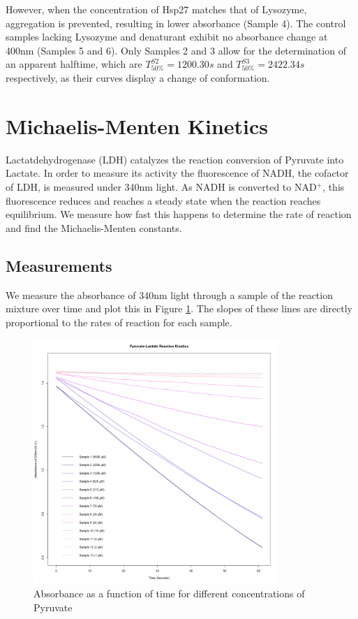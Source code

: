 \documentclass[a4paper,11pt]{article}
\begin{document}
            However, when the concentration of Hsp27 matches that of Lysozyme, aggregation is prevented, 
            resulting in lower absorbance (Sample 4). 
            The control samples lacking Lysozyme and denaturant exhibit no absorbance change at 400nm (Samples 5 and 6). 
            Only Samples 2 and 3 allow for the determination of an apparent halftime, which are $T^{S2}_{50\%} = 1200.30s$
            and $T^{S3}_{50\%} = 2422.34s$ respectively, as their curves display a change of conformation.
    \pagebreak
    
    \section{Michaelis-Menten Kinetics}
        Lactatdehydrogenase (LDH) catalyzes the reaction conversion of Pyruvate into Lactate. 
        In order to measure its activity the fluorescence of NADH, the cofactor of LDH, is measured 
        under 340nm light. As NADH is converted to NAD$^+$, this fluorescence reduces and reaches a 
        steady state when the reaction reaches equilibrium. We measure how fast this happens to determine
        the rate of reaction and find the Michaelis-Menten constants.
        
        \subsection*{Measurements}
            We measure the absorbance of 340nm light through a sample of the reaction mixture over time
            and plot this in Figure \ref{fig:mm_rates}. The slopes of these lines are directly proportional
            to the rates of reaction for each sample.
            \begin{figure}[H]
                \centering
                \includegraphics[width=350px]{../resources/kinetics_rates.png}
                \caption{Absorbance  as a function of time for different concentrations of Pyruvate}\label{fig:mm_rates}
            \end{figure}
            
\end{document}
